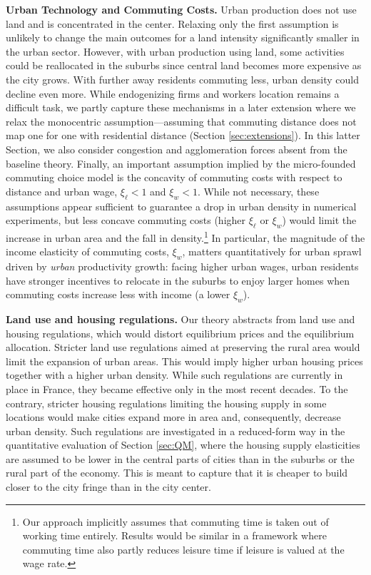 \documentclass[20250130-paper.tex]{subfiles}
\begin{document}
\textbf{Urban Technology and Commuting Costs.} Urban production does not use land and is concentrated in the center. Relaxing only the first assumption is unlikely to change the main outcomes for a land intensity significantly smaller in the urban sector. However, with urban production using land, some activities could be reallocated in the suburbs since central land becomes more expensive as the city grows. With further away residents commuting less, urban density could decline even more. While endogenizing firms and workers location remains a difficult task, we partly capture these mechanisms in a later extension where we relax the monocentric assumption---assuming that commuting distance does not map one for one with residential distance (Section \ref{sec:extensions}). In this latter Section, we also consider congestion and agglomeration forces absent from the baseline theory. Finally, an important assumption implied by the micro-founded commuting choice model is the concavity of commuting costs with respect to distance and urban wage, $\xi_\ell<1$ and $\xi_w<1$. While not necessary, these assumptions appear sufficient to guarantee a drop in urban density in numerical experiments, but less concave commuting costs (higher $\xi_\ell$ or $\xi_w$) would limit the increase in urban area and the fall in density.\footnote{Our approach implicitly assumes that commuting time is taken out of working time entirely. Results would be similar in a framework where commuting time also partly reduces leisure time if leisure is valued at the wage rate.} In particular, the magnitude of the income elasticity of commuting costs, $\xi_w$, matters quantitatively for urban sprawl driven by \textit{urban} productivity growth: facing higher urban wages, urban residents have stronger incentives to relocate in the suburbs to enjoy larger homes when commuting costs increase less with income (a lower $\xi_w$). 

\textbf{Land use and housing regulations.} Our theory abstracts from land use and housing regulations, which would distort equilibrium prices and the equilibrium allocation. Stricter land use regulations aimed at preserving the rural area would limit the expansion of urban areas. This would imply higher urban housing prices together with a higher urban density. While such regulations are currently in place in France, they became effective only in the most recent decades. To the contrary, stricter housing regulations limiting the housing supply in some locations would make cities expand more in area and, consequently, decrease urban density. Such regulations are investigated in a reduced-form way in the quantitative evaluation of Section \ref{sec:QM}, where the housing supply elasticities are assumed to be lower in the central parts of cities than in the suburbs or the rural part of the economy. This is meant to capture that it is cheaper to build closer to the city fringe than in the city center.
\end{document}
